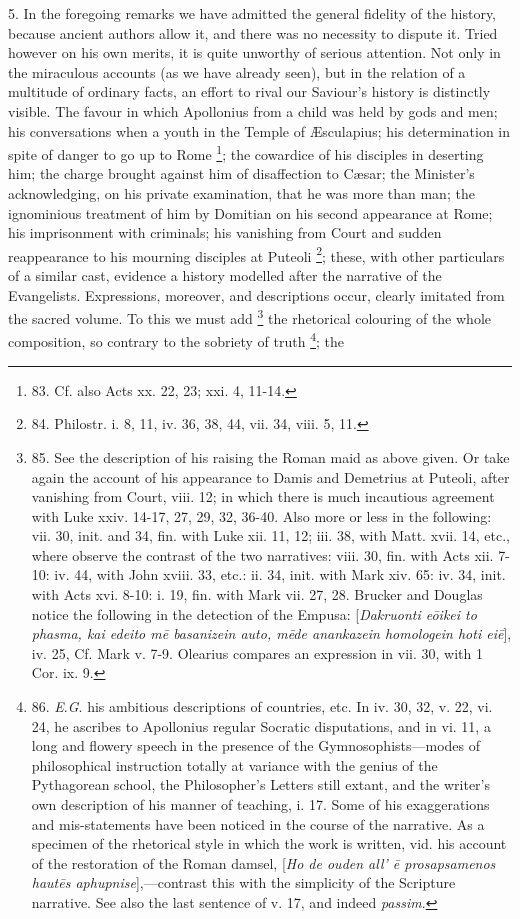 5. In the foregoing remarks we
have admitted the general fidelity of the history, because ancient
authors allow it, and there was no necessity to dispute it. Tried
however on his own merits, it is quite unworthy of serious attention.
Not only in the miraculous accounts (as we have already seen), but in
the relation of a multitude of ordinary facts, an effort to rival our
Saviour's history is distinctly visible. The favour in which
Apollonius from a child was held by gods and men; his conversations
when a youth in the Temple of Æsculapius; his determination in spite
of danger to go up to Rome \footnote{83.
Cf. also Acts xx. 22, 23; xxi. 4, 11-14.}; the cowardice of his disciples in deserting him; the charge
brought against him of disaffection to Cæsar; the Minister's
acknowledging, on his private examination, that he was more than man;
the ignominious treatment of him by Domitian on his second appearance
at Rome; his imprisonment with criminals; his vanishing from Court and
sudden reappearance to his mourning disciples at Puteoli \footnote{84.
Philostr. i. 8, 11, iv. 36, 38, 44, vii. 34, viii. 5, 11.}; these, with other particulars of a similar cast, evidence a
history modelled after the narrative of the Evangelists. Expressions,
moreover, and descriptions occur, clearly imitated from the sacred
volume. To this we must add \footnote{85.
See the description of his raising the Roman maid as above given. Or
take again the account of his appearance to Damis and Demetrius at
Puteoli, after vanishing from Court, viii. 12; in which there is much
incautious agreement with Luke xxiv. 14-17, 27, 29, 32, 36-40. Also
more or less in the following: vii. 30, init. and 34, fin. with Luke
xii. 11, 12; iii. 38, with Matt. xvii. 14, etc., where observe the
contrast of the two narratives: viii. 30, fin. with Acts xii. 7-10:
iv. 44, with John xviii. 33, etc.: ii. 34, init. with Mark xiv. 65:
iv. 34, init. with Acts xvi. 8-10: i. 19, fin. with Mark vii. 27, 28.
Brucker and Douglas notice the following in the detection of the
Empusa: [\emph{Dakruonti e\={o}ikei to phasma, kai edeito m\={e}
basanizein auto, m\={e}de anankazein homologein hoti ei\={e}}],
iv. 25, Cf. Mark v. 7-9. Olearius compares an expression in vii. 30,
with 1 Cor. ix. 9.}
the rhetorical colouring of the whole composition, so contrary to the
sobriety of truth \footnote{86.
\emph{E}.\emph{G}. his ambitious descriptions of countries, etc. In
iv. 30, 32, v. 22, vi. 24, he ascribes to Apollonius regular Socratic
disputations, and in vi. 11, a long and flowery speech in the presence
of the Gymnosophists—modes of philosophical instruction totally at
variance with the genius of the Pythagorean school, the Philosopher's
Letters still extant, and the writer's own description of his manner
of teaching, i. 17. Some of his exaggerations and mis-statements have
been noticed in the course of the narrative. As a specimen of the
rhetorical style in which the work is written, vid. his account of the
restoration of the Roman damsel, [\emph{Ho de ouden all' \={e}
prosapsamenos haut\={e}s aphupnise}],—contrast this with the
simplicity of the Scripture narrative. See also the last sentence of
v. 17, and indeed \emph{passim}.}; the
